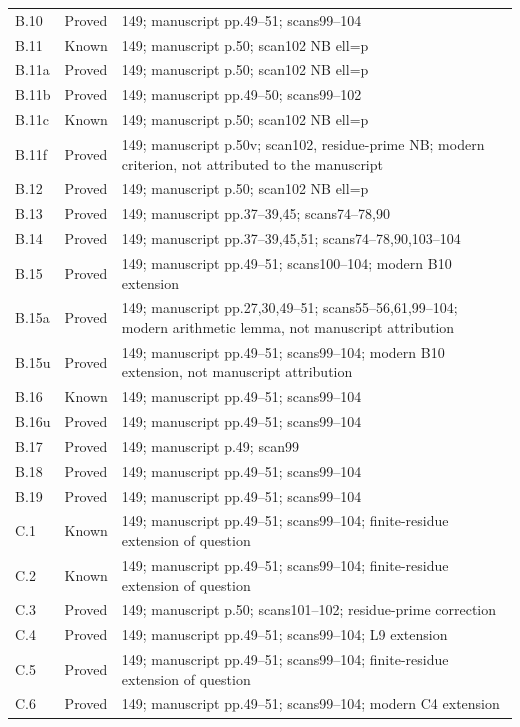 {\begin{longtable}{p{1.9cm}p{1.7cm}p{10.3cm}}
B.10 & Proved & 149; manuscript pp.49–51; scans99–104 \\
B.11 & Known & 149; manuscript p.50; scan102 NB ell=p \\
B.11a & Proved & 149; manuscript p.50; scan102 NB ell=p \\
B.11b & Proved & 149; manuscript pp.49–50; scans99–102 \\
B.11c & Known & 149; manuscript p.50; scan102 NB ell=p \\
B.11f & Proved & 149; manuscript p.50v; scan102, residue-prime NB; modern criterion, not attributed to the manuscript \\
B.12 & Proved & 149; manuscript p.50; scan102 NB ell=p \\
B.13 & Proved & 149; manuscript pp.37–39,45; scans74–78,90 \\
B.14 & Proved & 149; manuscript pp.37–39,45,51; scans74–78,90,103–104 \\
B.15 & Proved & 149; manuscript pp.49–51; scans100–104; modern B10 extension \\
B.15a & Proved & 149; manuscript pp.27,30,49–51; scans55–56,61,99–104; modern arithmetic lemma, not manuscript attribution \\
B.15u & Proved & 149; manuscript pp.49–51; scans99–104; modern B10 extension, not manuscript attribution \\
B.16 & Known & 149; manuscript pp.49–51; scans99–104 \\
B.16u & Proved & 149; manuscript pp.49–51; scans99–104 \\
B.17 & Proved & 149; manuscript p.49; scan99 \\
B.18 & Proved & 149; manuscript pp.49–51; scans99–104 \\
B.19 & Proved & 149; manuscript pp.49–51; scans99–104 \\
C.1 & Known & 149; manuscript pp.49–51; scans99–104; finite-residue extension of question \\
C.2 & Known & 149; manuscript pp.49–51; scans99–104; finite-residue extension of question \\
C.3 & Proved & 149; manuscript p.50; scans101–102; residue-prime correction \\
C.4 & Proved & 149; manuscript pp.49–51; scans99–104; L9 extension \\
C.5 & Proved & 149; manuscript pp.49–51; scans99–104; finite-residue extension of question \\
C.6 & Proved & 149; manuscript pp.49–51; scans99–104; modern C4 extension \\

\end{longtable}}
